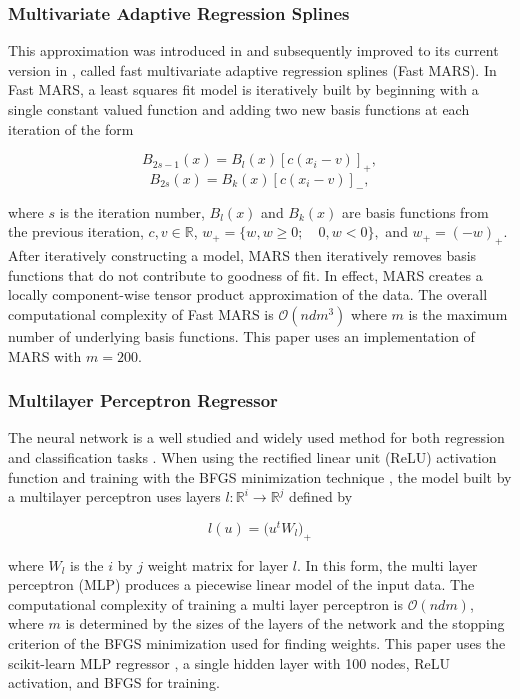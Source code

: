 \documentclass{scspaperproc}
\theoremstyle{scsthe}
\begin{document}
\subsubsection{Multivariate Adaptive Regression Splines}
This approximation was introduced in
 and subsequently improved to its
current version in , called fast
multivariate adaptive regression splines (Fast MARS). In Fast MARS, a
least squares fit model is iteratively built by beginning with a
single constant valued function and adding two new basis functions at
each iteration of the form

$$ B_{2s-1}(x) = B_l(x) [c(x_i-v)]_+ ,$$
$$ B_{2s}(x) = B_k(x) [c(x_i-v)]_- ,$$

where $s$ is the iteration number, $B_l(x)$ and $B_k(x)$ are basis
functions from the previous iteration, $c, v \in \mathbb{R}$, $w_+ =
\{w, w \geq 0;\quad 0, w < 0\},$ and $w_+ = (-w)_+$. After iteratively
constructing a model, MARS then iteratively removes basis functions
that do not contribute to goodness of fit. In effect, MARS creates a
locally component-wise tensor product approximation of the data. The
overall computational complexity of Fast MARS is $\mathcal{O}(n d
m^3)$ where $m$ is the maximum number of underlying basis
functions. This paper uses an implementation of MARS
 with $m = 200$.

\subsubsection{Multilayer Perceptron Regressor}
The neural network is a well studied and widely used method for both
regression and classification tasks
. When using the rectified linear unit
(ReLU) activation function  and training
with the BFGS minimization technique , the
model built by a multilayer perceptron uses layers $l : \mathbb{R}^{i}
\rightarrow \mathbb{R}^{j}$ defined by

$$ l(u) = \big( u^t W_l \big)_+ $$

where $W_l$ is the $i$ by $j$ weight matrix for layer $l$. In this
form, the multi layer perceptron (MLP) produces a piecewise linear
model of the input data. The computational complexity of training a
multi layer perceptron is $\mathcal{O}(n d m)$, where $m$ is
determined by the sizes of the layers of the network and the stopping
criterion of the BFGS minimization used for finding weights. This
paper uses the scikit-learn MLP regressor , a
single hidden layer with 100 nodes, ReLU activation, and BFGS for
training.
\end{document}
